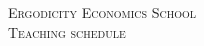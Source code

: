 \documentclass[10pt]{article} %
\begin{document}
\pagestyle{empty} %

\setlength{\parindent}{0pt} %



\begin{center}
	\textsc{\LARGE Ergodicity Economics School}\\ %
	\textsc{\large Teaching schedule} %
\end{center}

\end{document}
